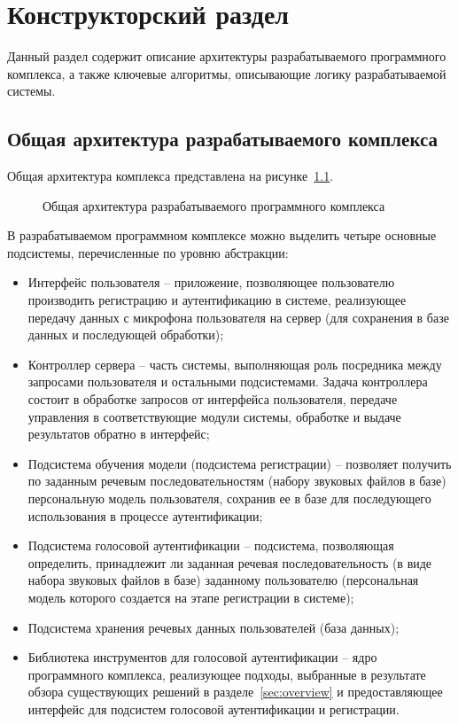 \chapter{Конструкторский раздел}
Данный раздел содержит описание архитектуры разрабатываемого программного комплекса, а также ключевые алгоритмы, описывающие логику разрабатываемой системы.

\section{Общая архитектура разрабатываемого комплекса}
\label{sec:main_arch}

Общая архитектура комплекса представлена на рисунке~\ref{fig:main_arch}.

\begin{figure}[h]
    \caption{Общая архитектура разрабатываемого программного комплекса}
    \label{fig:main_arch}
\end{figure}

В разрабатываемом программном комплексе можно выделить четыре основные подсистемы, перечисленные по уровню абстракции:
\begin{itemize}
\item Интерфейс пользователя -- приложение, позволяющее пользователю производить регистрацию и аутентификацию в системе, реализующее передачу данных с микрофона пользователя на сервер (для сохранения в базе данных и последующей обработки);
\item Контроллер сервера -- часть системы, выполняющая роль посредника между запросами пользователя и остальными подсистемами. Задача контроллера состоит в обработке запросов от интерфейса пользователя, передаче управления в соответствующие модули системы, обработке и выдаче результатов обратно в интерфейс;
\item Подсистема обучения модели (подсистема регистрации) -- позволяет получить по заданным речевым последовательностям (набору звуковых файлов в базе) персональную модель пользователя, сохранив ее в базе для последующего использования в процессе аутентификации;
\item Подсистема голосовой аутентификации -- подсистема, позволяющая определить, принадлежит ли заданная речевая последовательность (в виде набора звуковых файлов в базе) заданному пользователю (персональная модель которого создается на этапе регистрации в системе);
\item Подсистема хранения речевых данных пользователей (база данных);
\item Библиотека инструментов для голосовой аутентификации -- ядро программного комплекса, реализующее подходы, выбранные в результате обзора существующих решений в разделе~\ref{sec:overview} и предоставляющее интерфейс для подсистем голосовой аутентификации и регистрации.
\end{itemize}

